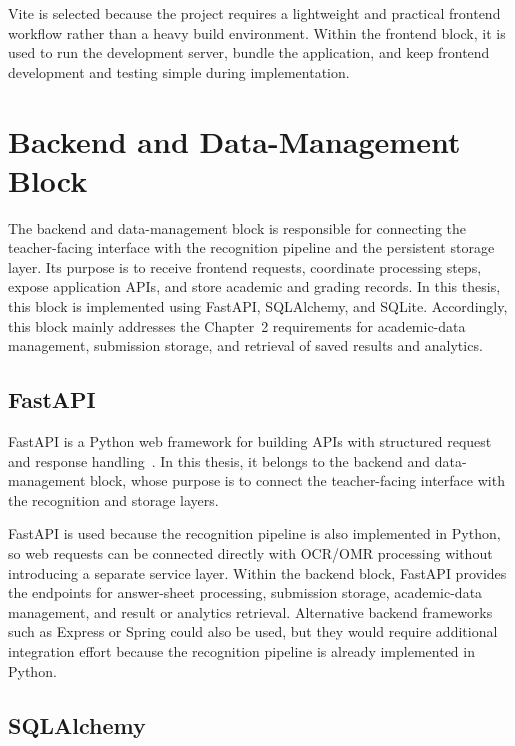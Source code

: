 \documentclass[../Main.tex]{subfiles}
\begin{document}
Vite is selected because the project requires a lightweight and practical
frontend workflow rather than a heavy build environment. Within the frontend
block, it is used to run the development server, bundle the application, and
keep frontend development and testing simple during implementation.

\section{Backend and Data-Management Block}
\label{section:3.3}

The backend and data-management block is responsible for connecting the
teacher-facing interface with the recognition pipeline and the persistent
storage layer. Its purpose is to receive frontend requests, coordinate
processing steps, expose application APIs, and store academic and grading
records. In this thesis, this block is implemented using FastAPI, SQLAlchemy,
and SQLite.
Accordingly, this block mainly addresses the Chapter~2 requirements for
academic-data management, submission storage, and retrieval of saved results
and analytics.

\subsection{FastAPI}
\label{subsection:3.3.1}

FastAPI is a Python web framework for building APIs with structured request and
response handling~\cite{fastapi2026}. In this thesis, it belongs to the backend
and data-management block, whose purpose is to connect the teacher-facing
interface with the recognition and storage layers.

FastAPI is used because the recognition pipeline is also implemented in Python,
so web requests can be connected directly with OCR/OMR processing without
introducing a separate service layer. Within the backend block, FastAPI
provides the endpoints for answer-sheet processing, submission storage,
academic-data management, and result or analytics retrieval. Alternative
backend frameworks such as Express or Spring could also be used, but they would
require additional integration effort because the recognition pipeline is
already implemented in Python.

\subsection{SQLAlchemy}
\label{subsection:3.3.2}
\end{document}
